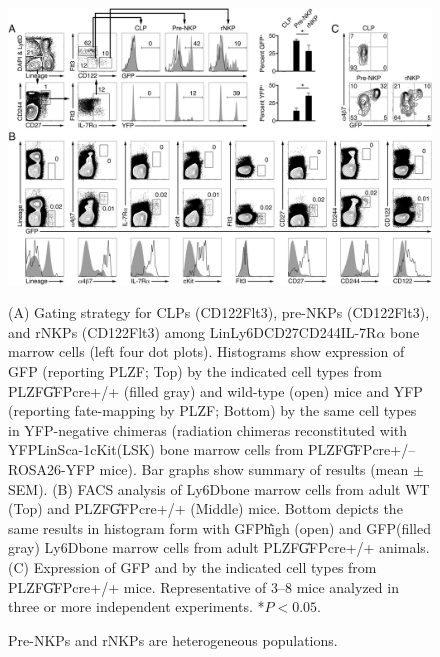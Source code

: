 \begin{figure}[p]
\begin{center}
	\includegraphics[width=\textwidth]{figures/chapter2/F1}
\end{center}
	\caption{Pre-NKPs and rNKPs are heterogeneous populations.} 
	(A) Gating strategy for CLPs (CD122\UM Flt3\UP), pre-NKPs (CD122\UM Flt3\UM), and rNKPs (CD122\UP Flt3\UM) among Lin\UM Ly6D\UM CD27\UP CD244\UP IL-7R$\alpha$\UP{} bone marrow cells (left four dot plots). Histograms show expression of GFP (reporting PLZF; Top) by the indicated cell types from PLZF\U{GFPcre+/+} (filled gray) and wild-type (open) mice and YFP (reporting fate-mapping by PLZF; Bottom) by the same cell types in YFP-negative chimeras (radiation chimeras reconstituted with YFP\UM Lin\UM Sca-1\UP cKit\UP (LSK) bone marrow cells from PLZF\U{GFPcre+/--} ROSA26-YFP mice). Bar graphs show summary of results (mean $\pm$ SEM). (B) FACS analysis of Ly6D\UM bone marrow cells from adult WT (Top) and PLZF\U{GFPcre+/+} (Middle) mice. Bottom depicts the same results in histogram form with GFP\U{high} (open) and GFP\UM (filled gray) Ly6D\UM bone marrow cells from adult PLZF\U{GFPcre+/+} animals. (C) Expression of GFP and \ab{} by the indicated cell types from PLZF\U{GFPcre+/+} mice. Representative of 3–8 mice analyzed in three or more independent experiments. *$P < 0.05$.
	\label{fig:chap2_F1}
\end{figure}


